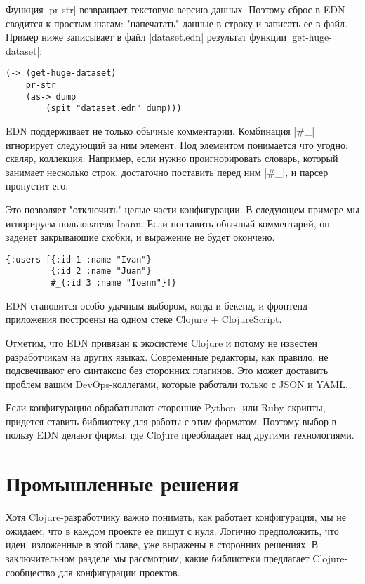 Функция \spverb|pr-str| возвращает текстовую версию данных. Поэтому сброс в EDN
сводится к простым шагам: "напечатать" данные в строку и записать ее в
файл. Пример ниже записывает в файл \spverb|dataset.edn| результат функции
\spverb|get-huge-dataset|:

\begin{verbatim}
(-> (get-huge-dataset)
    pr-str
    (as-> dump
        (spit "dataset.edn" dump)))
\end{verbatim}

EDN поддерживает не только обычные комментарии. Комбинация \spverb|#_| игнорирует
следующий за ним элемент. Под элементом понимается что угодно: скаляр,
коллекция. Например, если нужно проигнорировать словарь, который занимает
несколько строк, достаточно поставить перед ним \spverb|#_|, и парсер пропустит
его.

Это позволяет "отключить" целые части конфигурации. В следующем примере мы
игнорируем пользователя Ioann. Если поставить обычный комментарий, он заденет
закрывающие скобки, и выражение не будет окончено.

\begin{verbatim}
{:users [{:id 1 :name "Ivan"}
         {:id 2 :name "Juan"}
         #_{:id 3 :name "Ioann"}]}
\end{verbatim}

EDN становится особо удачным выбором, когда и бекенд, и фронтенд приложения
построены на одном стеке Clojure + ClojureScript.

Отметим, что EDN привязан к экосистеме Clojure и потому не известен
разработчикам на других языках. Современные редакторы, как правило, не
подсвечивают его синтаксис без сторонних плагинов. Это может доставить проблем
вашим DevOps-коллегами, которые работали только с JSON и YAML.

Если конфигурацию обрабатывают сторонние Python- или Ruby-скрипты, придется
ставить библиотеку для работы с этим форматом. Поэтому выбор в пользу EDN делают
фирмы, где Clojure преобладает над другими технологиями.

\section{Промышленные решения}

Хотя Clojure-разработчику важно понимать, как работает конфигурация, мы не
ожидаем, что в каждом проекте ее пишут с нуля. Логично предположить, что идеи,
изложенные в этой главе, уже выражены в сторонних решениях. В заключительном
разделе мы рассмотрим, какие библиотеки предлагает Clojure-сообщество для
конфигурации проектов.

